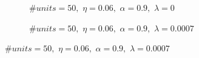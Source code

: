 \documentclass[11pt]{article}
\begin{document}
\begin{figure}[H]
     \begin{subfigure}[b]{0.45\textwidth}
         \centering
         \caption{$\# units = 50,\,\, \eta = 0.06,\,\, \alpha = 0.9,\,\, \lambda = 0$}
         \label{fig:over_2}
     \end{subfigure}
     \hfill
     \begin{subfigure}[b]{0.45\textwidth}
         \centering
         \caption{$\# units = 50,\,\, \eta = 0.06,\,\, \alpha = 0.9,\,\, \lambda = 0.0007$}
         \label{fig:reg_2}
     \end{subfigure}
     \centering

\end{figure}
\end{document}
